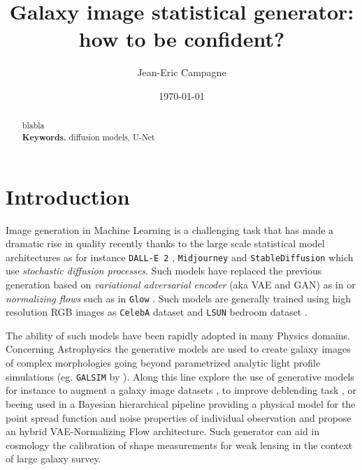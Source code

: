 \documentclass[11pt]{amsart}
\title{Galaxy image statistical generator: how to be confident?}
\author{Jean-Eric Campagne}
\date{\today}
\begin{document}
\maketitle
%
\begin{abstract}
blabla
\\
\smallskip
\noindent \textbf{Keywords.} diffusion models, U-Net
\end{abstract}

\section{Introduction}
\label{sec:Intro}
Image generation in Machine Learning is a challenging task that has made a dramatic rise in quality recently thanks to the large scale statistical model architectures as for instance \texttt{DALL-E 2} \citep{ramesh2022}, \texttt{Midjourney} \citep{Oppenlaender2022} and \texttt{StableDiffusion} \citep{Rombach2022} which use \textit{stochastic diffusion processes}. Such models have replaced the previous generation based on \textit{variational adversarial encoder} (aka VAE and GAN) as in \citep{KarrasALL18} or \textit{normalizing flows} such as in \texttt{Glow} \citep{Kingma2018}. Such models are generally trained using high resolution RGB images as \texttt{CelebA} dataset \citep{Liu2015} and \texttt{LSUN} bedroom dataset \citep{Yu2015}. 


The ability of such models have been rapidly adopted in many Physics domains. Concerning 
Astrophysics the generative models are used to create galaxy images of complex morphologies going beyond parametrized analytic light profile simulations (eg. \texttt{GALSIM} by \cite{ROWE2015121}). Along this line \cite{Lanusse2021} explore the use of generative models for instance to augment a galaxy image datasets \citep{ Fussell2019}, to improve deblending task \citep{Hemmati_2022,Arcelin2020}, or beeing used in a  Bayesian hierarchical pipeline providing a physical model for the point spread function and noise properties of individual observation and propose an hybrid VAE-Normalizing Flow architecture. Such generator can aid in cosmology the calibration of shape measurements for weak lensing in the context of large galaxy survey.



\end{document}
